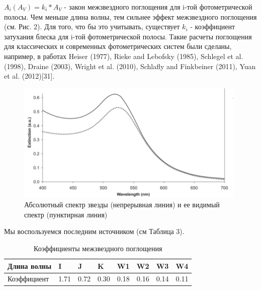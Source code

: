 \documentclass[12pt, a4paper]{article}
\begin{document}
	$A_i(A_V) = k_i*A_V$ - закон межзвездного поглощения для i-той фотометрической полосы. Чем меньше длина волны, тем сильнее эффект межзвездного поглощения (см. Рис. 2). Для того, что бы это учитывать, существует $k_i$ - коэффициент затухания блеска для i-той фотометрической полосы. Такие расчеты поглощения для классических и современных фотометрических систем были сделаны, например, в работах Heiser (1977), Rieke and Lebofsky (1985), Schlegel et al. (1998), Draine (2003), Wright et al. (2010), Schlafly and Finkbeiner (2011), Yuan et al. (2012)[31].
	\begin{figure}[h]
	\centering
	\includegraphics[width=11cm]{extinction}
	\caption{Абсолютный спектр звезды (непрерывная линия) \newline и ее видимый спектр (пунктирная линия)}
	\end{figure}

	Мы воспользуемся последним источником (см Таблица 3).
	\begin{table}[!ht]
	\centering
	\setlength{\tabcolsep}{3pt}
	\begin{tabular}{|l|l|l|l|l|l|l|l|}
	\hline
	Длина волны & I & J & K & W1 & W2 & W3 & W4 \\ \hline
	Коэффициент & 1.71 & 0.72 & 0.30 & 0.18 & 0.16 & 0.14 & 0.11 \\ \hline
	\end{tabular}
	\caption{Коэффициенты межзвездного поглощения}
	\end{table}
\end{document}
